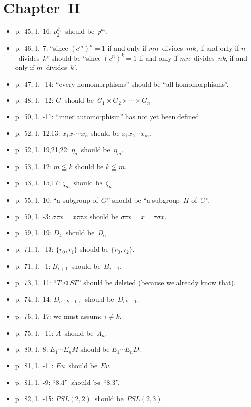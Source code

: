 \documentclass[letterpaper,12pt]{article}
\newcommand{\normal}{\trianglelefteq}
\begin{document}
\section*{Chapter~II}
\begin{itemize}
\item p.~45, l.~16: \(p_2^{k_2}\)~should be~\(p^{k_2}\).
\item p.~46, l.~7: ``since \((c^m)^k=1\) if and only if \(mn\)~divides~\(mk\), if and only if \(n\)~divides~\(k\)'' should be ``since \((c^n)^k=1\) if and only if \(mn\)~divides~\(nk\), if and only if \(m\)~divides~\(k\)''.
\item p.~47, l.~-14: ``every homomorphisms'' should be ``all homomorphisms''.
\item p.~48, l.~-12: \(G\)~should be~\(G_1\times G_2\times\cdots\times G_n\).
\item p.~50, l.~-17: ``inner automorphism'' has not yet been defined.
\item p.~52, l.~12,13: \(x_1x_2\cdots x_n\) should be \(x_1x_2\cdots x_m\).
\item p.~52, l.~19,21,22: \(\eta_n\)~should be~\(\eta_m\).
\item p.~53, l.~12: \(m\leqq k\) should be \(k\leqq m\).
\item p.~53, l.~15,17: \(\zeta_m\)~should be~\(\zeta_n\).
\item p.~55, l.~10: ``a subgroup of~\(G\)'' should be ``a subgroup~\(H\) of~\(G\)''.
\item p.~60, l.~-3: \(\sigma\tau x=x\tau\sigma x\) should be \(\sigma\tau x=x=\tau\sigma x\).
\item p.~69, l.~19: \(D_4\)~should be~\(D_6\).
\item p.~71, l.~-13: \(\{r_0,r_1\}\) should be \(\{r_0,r_2\}\).
\item p.~71, l.~-1: \(B_{i+1}\)~should be~\(B_{j+1}\).
\item p.~73, l.~11: ``\(T\normal ST\)'' should be deleted (because we already know that).
\item p.~74, l.~14: \(D_{\sigma(k-1)}\)~should be~\(D_{\sigma k-1}\).
\item p.~75, l.~17: we must assume \(i\ne k\).
\item p.~75, l.~-11: \(A\)~should be~\(A_n\).
\item p.~80, l.~8: \(E_1\cdots E_nM\) should be \(E_1\cdots E_n D\).
\item p.~81, l.~-11: \(Eu\)~should be~\(Ev\).
\item p.~81, l.~-9: ``8.4''~should be~``8.3''.
\item p.~82, l.~-15: \(PSL(2,2)\)~should be~\(PSL(2,3)\).

\end{itemize}
\end{document}
